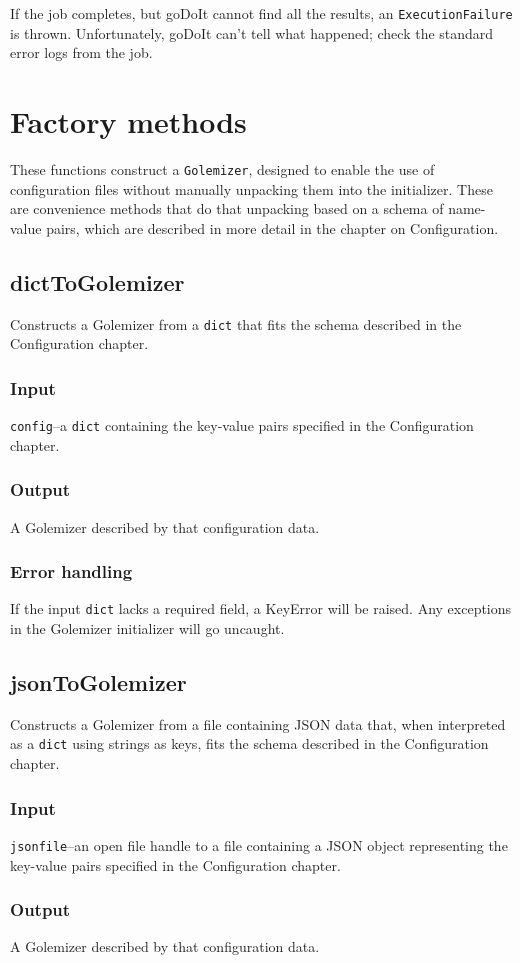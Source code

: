 \documentclass[11pt,ebook,oneside,final]{memoir} %
\begin{document}
If the job completes, but goDoIt cannot find all the results, an \texttt{ExecutionFailure} is thrown. Unfortunately, goDoIt can't tell what happened; check the standard error logs from the job.

\section{Factory methods}
These functions construct a \texttt{Golemizer}, designed to enable the use of configuration files without manually unpacking them into the initializer. These are convenience methods that do that unpacking based on a schema of name-value pairs, which are described in more detail in the chapter on Configuration.
\subsection{dictToGolemizer}
Constructs a Golemizer from a \texttt{dict} that fits the schema described in the Configuration chapter.
\subsubsection*{Input}
\texttt{config}--a \texttt{dict} containing the key-value pairs specified in the Configuration chapter.
\subsubsection*{Output}
A Golemizer described by that configuration data.
\subsubsection*{Error handling}
If the input \texttt{dict} lacks a required field, a KeyError will be raised. Any exceptions in the Golemizer initializer will go uncaught.
\subsection{jsonToGolemizer}
Constructs a Golemizer from a file containing JSON data that, when interpreted as a \texttt{dict} using strings as keys, fits the schema described in the Configuration chapter.
\subsubsection*{Input}
\texttt{jsonfile}--an open file handle to a file containing a JSON object representing the key-value pairs specified in the Configuration chapter.
\subsubsection*{Output}
A Golemizer described by that configuration data.
\end{document}
